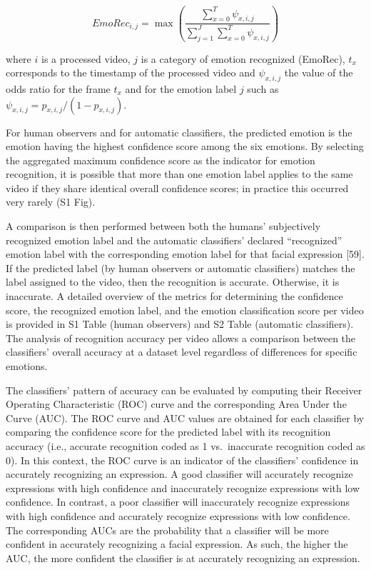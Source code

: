 \documentclass[10pt,letterpaper]{article}
\begin{document}
\begin{equation}
{EmoRec_{i,j}} = \max\left(\frac{\sum_{x = 0}^{T}\psi_{x,i,j}}{\sum_{j = 1}^{J}\sum_{x = 0}^{T}\psi_{x,i,j}}\right)\label{eq:two}
\end{equation}

where \(i\) is a processed video, \(j\) is a category of emotion recognized (EmoRec), \(t_x\) corresponds to the timestamp of the processed video and \(\psi_{x,i,j}\) the value of the odds ratio for the frame \(t_x\) and for the emotion label \(j\) such as \(\psi_{x,i,j} = p_{x,i,j}/(1 - p_{x,i,j})\).

For human observers and for automatic classifiers, the predicted emotion is the emotion having the highest confidence score among the six emotions. By selecting the aggregated maximum confidence score as the indicator for emotion recognition, it is possible that more than one emotion label applies to the same video if they share identical overall confidence scores; in practice this occurred very rarely (S1 Fig).

A comparison is then performed between both the humans' subjectively recognized emotion label and the automatic classifiers' declared ``recognized'' emotion label with the corresponding emotion label for that facial expression {[}59{]}. If the predicted label (by human observers or automatic classifiers) matches the label assigned to the video, then the recognition is accurate. Otherwise, it is inaccurate. A detailed overview of the metrics for determining the confidence score, the recognized emotion label, and the emotion classification score per video is provided in S1 Table (human observers) and S2 Table (automatic classifiers). The analysis of recognition accuracy per video allows a comparison between the classifiers' overall accuracy at a dataset level regardless of differences for specific emotions.

The classifiers' pattern of accuracy can be evaluated by computing their Receiver Operating Characteristic (ROC) curve and the corresponding Area Under the Curve (AUC). The ROC curve and AUC values are obtained for each classifier by comparing the confidence score for the predicted label with its recognition accuracy (i.e., accurate recognition coded as 1 vs.~inaccurate recognition coded as 0). In this context, the ROC curve is an indicator of the classifiers' confidence in accurately recognizing an expression. A good classifier will accurately recognize expressions with high confidence and inaccurately recognize expressions with low confidence. In contrast, a poor classifier will inaccurately recognize expressions with high confidence and accurately recognize expressions with low confidence. The corresponding AUCs are the probability that a classifier will be more confident in accurately recognizing a facial expression. As such, the higher the AUC, the more confident the classifier is at accurately recognizing an expression.
\end{document}
